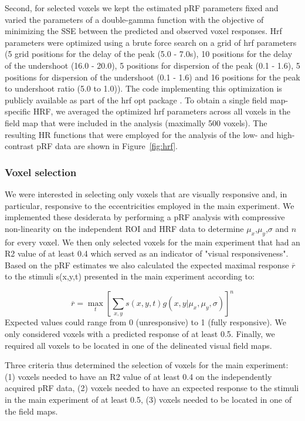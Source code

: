 Second, for selected voxels we kept the estimated pRF parameters fixed and varied the parameters of a double-gamma function with the objective of minimizing the SSE between the predicted and observed voxel responses. Hrf parameters were optimized using a brute force search on a grid of hrf parameters (5 grid positions for the delay of the peak (5.0 - 7.0s), 10 positions for the delay of the undershoot (16.0 - 20.0), 5 positions for dispersion of the peak (0.1 - 1.6), 5 positions for dispersion of the undershoot (0.1 - 1.6) and 16 positions for the peak to undershoot ratio (5.0 to 1.0)). The code implementing this optimization is publicly available as part of the hrf opt package \parencite{hrf_opt}. To obtain a single field map-specific HRF, we averaged the optimized hrf parameters across all voxels in the field map that were included in the analysis (maximally 500 voxels). The resulting HR functions that were employed for the analysis of the low- and high-contrast pRF data are shown in Figure~\ref{fig:hrf}.

\subsubsection{Voxel selection}
We were interested in selecting only voxels that are visually responsive and, in particular, responsive to the eccentricities employed in the main experiment. We implemented these desiderata by performing a pRF analysis with compressive non-linearity on the independent ROI and HRF data to determine $\mu_x$,$\mu_y$,$\sigma$ and $n$ for every voxel. We then only selected voxels for the main experiment that had an R2 value of at least 0.4 which served as an indicator of "visual responsiveness". Based on the pRF estimates we also calculated the expected maximal response $\overline{r}$ to the stimuli s(x,y,t) presented in the main experiment according to:

\begin{equation}
\overline{r} = \max_t [\sum_{x,y} s(x,y,t) g(x, y|\mu_x,\mu_y,\sigma)]^n
\end{equation}
Expected values could range from 0 (unresponsive) to 1 (fully responsive). We only considered voxels with a predicted response of at least 0.5. Finally, we required all voxels to be located in one of the delineated visual field maps.

Three criteria thus determined the selection of voxels for the main experiment: (1) voxels needed to have an R2 value of at least 0.4 on the independently acquired pRF data, (2) voxels needed to have an expected response to the stimuli in the main experiment of at least 0.5, (3) voxels needed to be located in one of the field maps.

